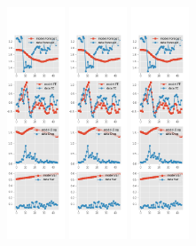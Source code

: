 \documentclass[]{article}
\begin{document}
\begin{figure}[ht]
\begin{subfigure}[b]{\textwidth}
	\includegraphics[width=0.19\textwidth]{figures/spf_se_est_joint_diag0.png}
	\includegraphics[width=0.19\textwidth]{figures/spf_se_est_joint_diag1.png}
	\includegraphics[width=0.19\textwidth]{figures/spf_se_est_joint_diag2.png}

\end{subfigure}
\end{figure}
\end{document}
